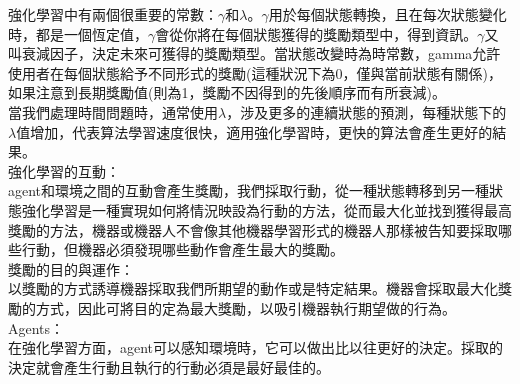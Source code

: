 \documentclass[14pt,a4paper]{report}  %
\begin{document}
 強化學習中有兩個很重要的常數：$\gamma$和$\lambda$。$\gamma$用於每個狀態轉換，且在每次狀態變化時，都是一個恆定值，$\gamma$會從你將在每個狀態獲得的獎勵類型中，得到資訊。$\gamma$又叫衰減因子，決定未來可獲得的獎勵類型。當狀態改變時為時常數，gamma允許使用者在每個狀態給予不同形式的獎勵(這種狀況下為0，僅與當前狀態有關係)，如果注意到長期獎勵值(則為1，獎勵不因得到的先後順序而有所衰減)。\\
 當我們處理時間問題時，通常使用$\lambda$，涉及更多的連續狀態的預測，每種狀態下的$\lambda$值增加，代表算法學習速度很快，適用強化學習時，更快的算法會產生更好的結果。\\

強化學習的互動：\\[1pt]
 agent和環境之間的互動會產生獎勵，我們採取行動，從一種狀態轉移到另一種狀態強化學習是一種實現如何將情況映設為行動的方法，從而最大化並找到獲得最高獎勵的方法，機器或機器人不會像其他機器學習形式的機器人那樣被告知要採取哪些行動，但機器必須發現哪些動作會產生最大的獎勵。\\[1pt]
獎勵的目的與運作：\\
 以獎勵的方式誘導機器採取我們所期望的動作或是特定結果。機器會採取最大化獎勵的方式，因此可將目的定為最大獎勵，以吸引機器執行期望做的行為。\\[6pt]
Agents：\\[6pt]
 在強化學習方面，agent可以感知環境時，它可以做出比以往更好的決定。採取的決定就會產生行動且執行的行動必須是最好最佳的。\\[12pt]
\end{document}
